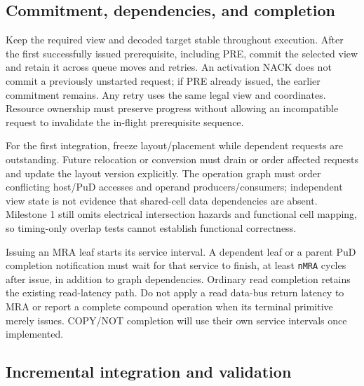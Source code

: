 \documentclass[9pt,twocolumn]{extarticle}
\newcommand{\param}[1]{\texttt{#1}}
\begin{document}
\subsection{Commitment, dependencies, and completion}

Keep the required view and decoded target stable throughout execution.
After the first successfully issued prerequisite, including PRE, commit the
selected view and retain it across queue moves and retries. An activation
NACK does not commit a previously unstarted request; if PRE already issued,
the earlier commitment remains. Any retry uses the same legal view and
coordinates. Resource ownership must preserve progress without allowing an
incompatible request to invalidate the in-flight prerequisite sequence.

For the first integration, freeze layout/placement while dependent requests
are outstanding. Future relocation or conversion must drain or order affected
requests and update the layout version explicitly. The operation graph must
order conflicting host/PuD accesses and operand producers/consumers; independent
view state is not evidence that shared-cell data dependencies are absent.
Milestone 1 still omits electrical intersection hazards and functional cell
mapping, so timing-only overlap tests cannot establish functional correctness.

Issuing an MRA leaf starts its service interval. A dependent leaf or a parent
PuD completion notification must wait for that service to finish, at least
\param{nMRA} cycles after issue, in addition to graph dependencies. Ordinary
read completion retains the existing read-latency path. Do not apply a read
data-bus return latency to MRA or report a complete compound operation when
its terminal primitive merely issues. COPY/NOT completion will use their
own service intervals once implemented.

\subsection{Incremental integration and validation}
\end{document}

